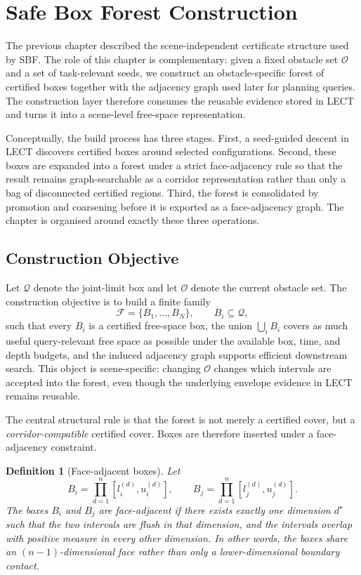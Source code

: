 \documentclass[journal]{IEEEtran}
\DeclareRobustCommand{\textsc}[1]{\textnormal{\MakeUppercase{#1}}}
\newtheorem{definition}{Definition}
\newcommand{\sbf}{\textsc{SBF}}
\newcommand{\calO}{\ensuremath{\mathcal{O}}}
\newcommand{\Q}{\ensuremath{\mathcal{Q}}}
\begin{document}
\section{Safe Box Forest Construction}\label{sec:forest}

The previous chapter described the scene-independent certificate structure used
by \sbf{}. The role of this chapter is complementary: given a fixed obstacle
set $\calO$ and a set of task-relevant seeds, we construct an
obstacle-specific forest of certified boxes together with the adjacency graph
used later for planning queries. The construction layer therefore consumes the
reusable evidence stored in LECT and turns it into a scene-level free-space
representation.

Conceptually, the build process has three stages. First, a seed-guided descent
in LECT discovers certified boxes around selected configurations. Second, these
boxes are expanded into a forest under a strict face-adjacency rule so that the
result remains graph-searchable as a corridor representation rather than only a
bag of disconnected certified regions. Third, the forest is consolidated by
promotion and coarsening before it is exported as a face-adjacency graph. The
chapter is organised around exactly these three operations.

\subsection{Construction Objective}\label{sec:forest_objective}

Let $\Q$ denote the joint-limit box and let $\calO$ denote the current obstacle
set. The construction objective is to build a finite family
\[
\mathcal{F} = \{B_1,\dots,B_N\}, \qquad B_i \subseteq \Q,
\]
such that every $B_i$ is a certified free-space box, the union
$\bigcup_i B_i$ covers as much useful query-relevant free space as possible
under the available box, time, and depth budgets, and the induced adjacency
graph supports efficient downstream search. This object is scene-specific:
changing $\calO$ changes which intervals are accepted into the forest, even
though the underlying envelope evidence in LECT remains reusable.

The central structural rule is that the forest is not merely a certified cover,
but a \emph{corridor-compatible} certified cover. Boxes are therefore inserted
under a face-adjacency constraint.

\begin{definition}[Face-adjacent boxes]\label{def:face_adjacent}
Let
\[
B_i = \prod_{d=1}^{n}[l_i^{(d)},u_i^{(d)}],
\qquad
B_j = \prod_{d=1}^{n}[l_j^{(d)},u_j^{(d)}].
\]
The boxes $B_i$ and $B_j$ are face-adjacent if there exists exactly one
dimension $d^\star$ such that the two intervals are flush in that dimension,
and the intervals overlap with positive measure in every other dimension. In
other words, the boxes share an $(n-1)$-dimensional face rather than only a
lower-dimensional boundary contact.
\end{definition}
\end{document}

